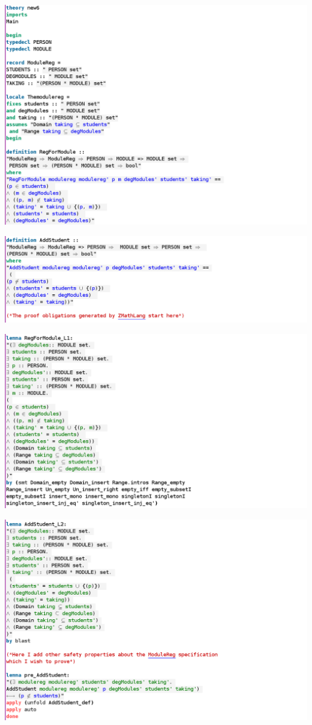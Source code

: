\noindent \includegraphics[width=15cm]{examples/modulereg/6imagea.png}

\noindent \includegraphics[width=15cm]{examples/modulereg/6imageb.png}

\noindent \includegraphics[width=15cm]{examples/modulereg/6imagec.png}

\noindent \includegraphics[width=15cm]{examples/modulereg/6imaged.png}

